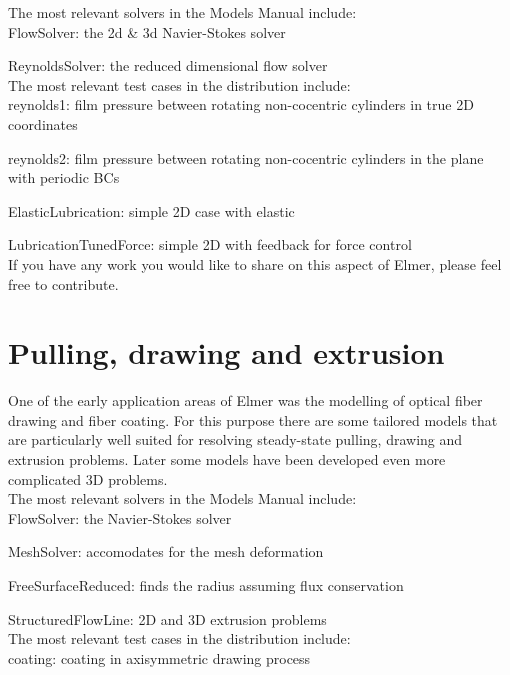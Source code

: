 \noindent The most relevant solvers in the Models Manual include:\\

    FlowSolver: the 2d \& 3d Navier-Stokes solver

    ReynoldsSolver: the reduced dimensional flow solver\\

\noindent The most relevant test cases in the distribution include:\\

    reynolds1: film pressure between rotating non-cocentric cylinders in true 2D coordinates

    reynolds2: film pressure between rotating non-cocentric cylinders in the plane with periodic BCs

    ElasticLubrication: simple 2D case with elastic

    LubricationTunedForce: simple 2D with feedback for force control\\

\noindent If you have any work you would like to share on this aspect of Elmer, please feel free to contribute. 

\section{Pulling, drawing and extrusion}

One of the early application areas of Elmer was the modelling of optical fiber drawing and fiber coating. For this purpose there are some tailored models that are particularly well suited for resolving steady-state pulling, drawing and extrusion problems. Later some models have been developed even more complicated 3D problems.\\

\noindent The most relevant solvers in the Models Manual include:\\

    FlowSolver: the Navier-Stokes solver

    MeshSolver: accomodates for the mesh deformation

    FreeSurfaceReduced: finds the radius assuming flux conservation

    StructuredFlowLine: 2D and 3D extrusion problems\\

\noindent The most relevant test cases in the distribution include:\\

    coating: coating in axisymmetric drawing process\\

